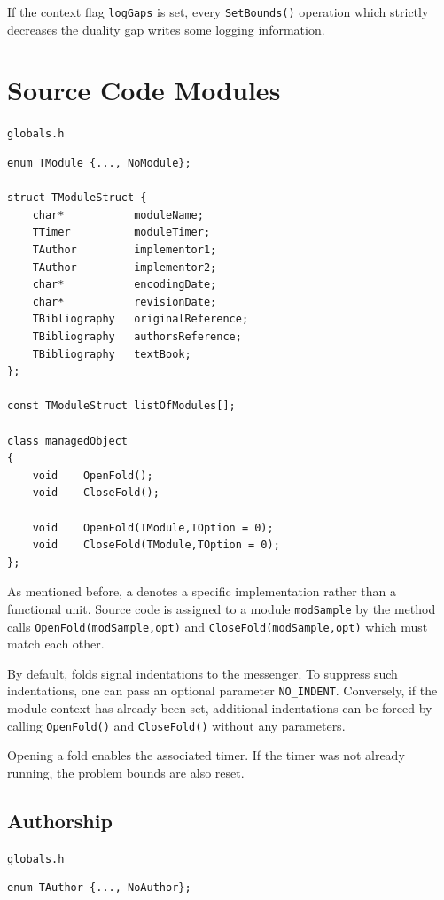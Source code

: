 \documentclass[a4paper,11pt,twoside]{book}
\begin{document}
\begin{multicols}{2}
If the context flag \verb/logGaps/ is set, every \verb/SetBounds()/ operation
which strictly decreases the duality gap writes some logging information.



\section{Source Code Modules}
\label{slb_modules}
\myincludes\verb/globals.h/
\begin{mymethods}
\begin{verbatim}
enum TModule {..., NoModule};

struct TModuleStruct {
    char*           moduleName;
    TTimer          moduleTimer;
    TAuthor         implementor1;
    TAuthor         implementor2;
    char*           encodingDate;
    char*           revisionDate;
    TBibliography   originalReference;
    TBibliography   authorsReference;
    TBibliography   textBook;
};

const TModuleStruct listOfModules[];

class managedObject
{
    void    OpenFold();
    void    CloseFold();

    void    OpenFold(TModule,TOption = 0);
    void    CloseFold(TModule,TOption = 0);
};
\end{verbatim}
\end{mymethods}
As mentioned before, a  denotes a specific implementation
rather than a functional unit. Source code is assigned to a module
\verb/modSample/ by the method calls \verb/OpenFold(modSample,opt)/ and
\verb/CloseFold(modSample,opt)/ which must match each other.

By default, folds signal indentations to the messenger. To suppress such
indentations, one can pass an optional parameter \verb/NO_INDENT/. Conversely,
if the module context has already been set, additional indentations can be
forced by calling \verb/OpenFold()/ and \verb/CloseFold()/ without any
parameters.

Opening a fold enables the associated timer. If the timer was not already
running, the problem bounds are also reset.


\subsection{Authorship}
\label{slb_authors}
\myincludes\verb/globals.h/
\begin{mymethods}
\begin{verbatim}
enum TAuthor {..., NoAuthor};


\end{verbatim}
\end{mymethods}
\end{multicols}
\end{document}
